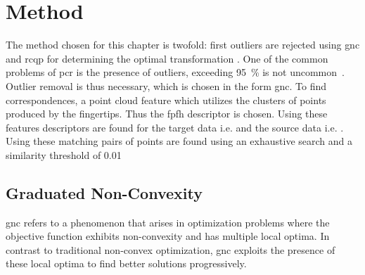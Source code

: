 \section{Method} \label{sec:2-pose-estimation-method}

The method chosen for this chapter is twofold: first outliers are rejected using \gls{gnc} and \gls{rcqp} for determining the optimal transformation . One of the common problems of \gls{pcr} is the presence of outliers, exceeding \SI{95}{\percent} is not uncommon~\cite{guaranteed-outlier-removal-for-point-cloud-registration-with-correspondences}. Outlier removal is thus necessary, which is chosen in the form \gls{gnc}. To find correspondences, a point cloud feature which utilizes the clusters of points produced by the fingertips. Thus the \gls{fpfh} descriptor is chosen. Using these features descriptors  are found for the target data i.e.  and the source data  i.e. . Using these matching pairs of points are found using an exhaustive search and a similarity threshold of \num{0.01}








\subsection{Graduated Non-Convexity} \label{subs:2-pose-estimation-graduated-non-convexity}

\gls{gnc} refers to a phenomenon that arises in optimization problems where the objective function exhibits non-convexity and has multiple local optima. In contrast to traditional non-convex optimization, \gls{gnc} exploits the presence of these local optima to find better solutions progressively. \medskip

